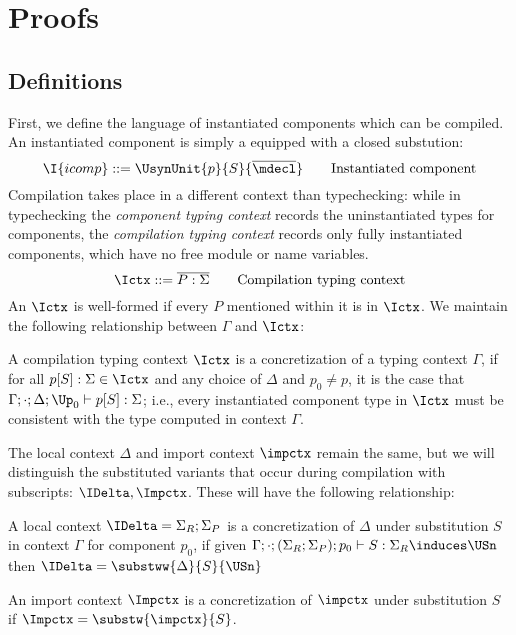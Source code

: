 \section{Proofs}

\subsection{Definitions}

First, we define the language of instantiated components which can be
compiled.  An instantiated component is simply a \unit{} equipped
with a closed substution:
%
\[
  \I{icomp} ::= \UsynUnit{p}{S}{\overline{\mdecl}} \qquad \text{Instantiated component} \\
\]
%
Compilation takes place in a different context than typechecking:
while in typechecking the \emph{component typing context} records
the uninstantiated types for components, the \emph{compilation typing context}
records only fully instantiated components, which have no free
module or name variables.
%
\[
  \Ictx ::= \overline{P : \Sigma} \qquad \text{Compilation typing context}
\]
%
An $\Ictx$ is well-formed if every $P$ mentioned within it is in $\Ictx$.
We maintain the following relationship between $\Gamma$ and $\Ictx$:

\begin{definition}
A compilation typing context $\Ictx$ is a concretization of a
typing context $\Gamma$, if for all $p[S] : \Sigma \in \Ictx$
and any choice of $\Delta$ and $p_0 \neq p$, it is the case that
$\Gamma; \cdot; \Delta; \Up_0 \vdash p[S] : \Sigma$; i.e., every instantiated component type in $\Ictx$ must be consistent with the type computed in context $\Gamma$.
\end{definition}
%
The local context $\Delta$ and import context $\impctx$ remain the same, but we will distinguish the substituted variants that occur during compilation with
subscripts: $\IDelta, \Impctx$.  These will have the following
relationship:

\begin{definition}
A local context $\IDelta = \Sigma_R; \Sigma_P$ is a concretization of
$\Delta$ under substitution
$S$ in context $\Gamma$ for component $p_0$, if
given $\Gamma; \cdot; (\Sigma_R; \Sigma_P); p_0 \vdash S : \Sigma_R \induces \USn$
then $\IDelta = \substww{\Delta}{S}{\USn}$
\end{definition}

\begin{definition}
An import context $\Impctx$ is a concretization of $\impctx$ under substitution
$S$ if $\Impctx = \substw{\impctx}{S}$.
\end{definition}


